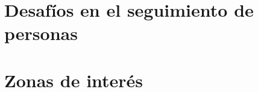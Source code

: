 
\section{Desafíos en el seguimiento de personas}
\label{sec:desafiosSeguimiento}


\section{Zonas de interés}
\label{sec:zonasInteres}
